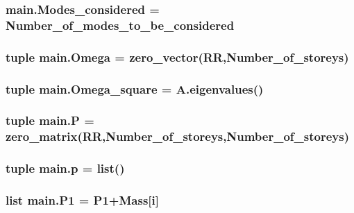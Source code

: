 \subsubsection[{Modes\+\_\+considered}]{\setlength{\rightskip}{0pt plus 5cm}main.\+Modes\+\_\+considered = Number\+\_\+of\+\_\+modes\+\_\+to\+\_\+be\+\_\+considered}\label{namespacemain_a9d22ac077c22a97b1b095068a1500d16}
\hypertarget{namespacemain_a0cc58897a39912c706ab64fd26e0d62e}{}
\subsubsection[{Omega}]{\setlength{\rightskip}{0pt plus 5cm}tuple main.\+Omega = zero\+\_\+vector(R\+R,Number\+\_\+of\+\_\+storeys)}\label{namespacemain_a0cc58897a39912c706ab64fd26e0d62e}
\hypertarget{namespacemain_abc7a524ddae98db1c2f4cf8535104feb}{}
\subsubsection[{Omega\+\_\+square}]{\setlength{\rightskip}{0pt plus 5cm}tuple main.\+Omega\+\_\+square = A.\+eigenvalues()}\label{namespacemain_abc7a524ddae98db1c2f4cf8535104feb}
\hypertarget{namespacemain_ad403610ba53df02f8dfaff8dd64227b3}{}
\subsubsection[{P}]{\setlength{\rightskip}{0pt plus 5cm}tuple main.\+P = zero\+\_\+matrix(R\+R,Number\+\_\+of\+\_\+storeys,Number\+\_\+of\+\_\+storeys)}\label{namespacemain_ad403610ba53df02f8dfaff8dd64227b3}
\hypertarget{namespacemain_ab31fc16b432d2248a6c76c6a18d741d0}{}
\subsubsection[{p}]{\setlength{\rightskip}{0pt plus 5cm}tuple main.\+p = list()}\label{namespacemain_ab31fc16b432d2248a6c76c6a18d741d0}
\hypertarget{namespacemain_add7e0394c94a2e2115aff785eb6995e3}{}
\subsubsection[{P1}]{\setlength{\rightskip}{0pt plus 5cm}list main.\+P1 = P1+Mass\mbox{[}{\bf i}\mbox{]}}\label{namespacemain_add7e0394c94a2e2115aff785eb6995e3}
\hypertarget{namespacemain_a1b83b7a3849a8e1c84b9906c45625fec}{}

